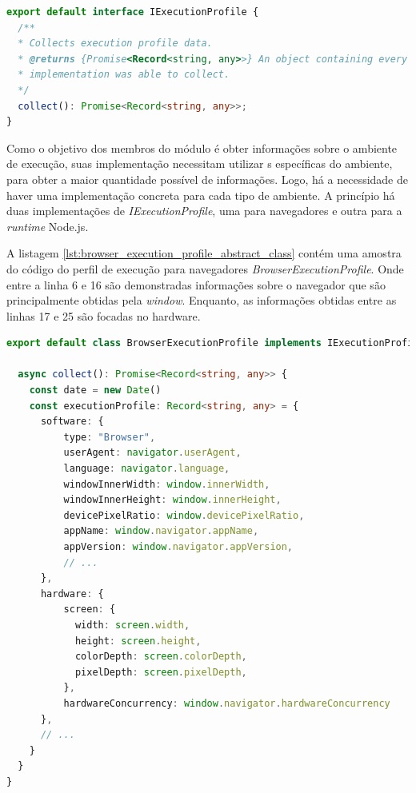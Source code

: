 \documentclass[12pt]{tcc}
\begin{document}
\begin{lstlisting}[label={lst:execution_profile_abstract_class}, caption={Implementação da classe responsável por representar um perfil de execução.}, language=TypeScript, breaklines=true]
export default interface IExecutionProfile {
  /**
  * Collects execution profile data.
  * @returns {Promise<Record<string, any>>} An object containing every execution profile data the
  * implementation was able to collect.
  */
  collect(): Promise<Record<string, any>>;
}
\end{lstlisting}

	Como o objetivo dos membros do módulo é obter informações sobre o ambiente de execução, suas implementação necessitam utilizar s específicas do ambiente, para obter a maior quantidade possível de informações.
	Logo, há a necessidade de haver uma implementação concreta para cada tipo de ambiente.
	A princípio há duas implementações de \emph{IExecutionProfile}, uma para navegadores e outra para a \emph{runtime} Node.js.

	A listagem \ref{lst:browser_execution_profile_abstract_class} contém uma amostra do código do perfil de execução para navegadores \emph{BrowserExecutionProfile}.
	Onde entre a linha 6 e 16 são demonstradas informações sobre o navegador que são principalmente obtidas pela  \emph{window}.
	Enquanto, as informações obtidas entre as linhas 17 e 25 são focadas no hardware.

\begin{minipage}{\linewidth}
\begin{lstlisting}[label={lst:browser_execution_profile_abstract_class}, caption={Fragmento de código da classe \emph{BrowserExecutionProfile} responsável por gerar um perfil de execução em navegadores.}, language=TypeScript, breaklines=true]
export default class BrowserExecutionProfile implements IExecutionProfile {

  async collect(): Promise<Record<string, any>> {
    const date = new Date()
    const executionProfile: Record<string, any> = {
      software: {
          type: "Browser",
          userAgent: navigator.userAgent,
          language: navigator.language,
          windowInnerWidth: window.innerWidth,
          windowInnerHeight: window.innerHeight,
          devicePixelRatio: window.devicePixelRatio,
          appName: window.navigator.appName,
          appVersion: window.navigator.appVersion,
          // ...
      },
      hardware: {
          screen: {
            width: screen.width,
            height: screen.height,
            colorDepth: screen.colorDepth,
            pixelDepth: screen.pixelDepth,
          },
          hardwareConcurrency: window.navigator.hardwareConcurrency
      },
      // ...
    }
  }
}
\end{lstlisting}
\end{minipage}
\end{document}
